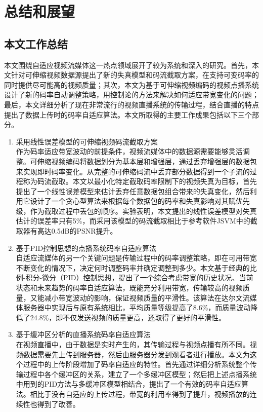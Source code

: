 \chapter{总结和展望}

\section{本文工作总结}

本文围绕自适应视频流媒体这一热点领域展开了较为系统和深入的研究。首先，本文针对可伸缩视频数据源提出了新的失真模型和码流截取方案，在支持可变码率的同时提供尽可能高的视频质量；其次，本文为基于可伸缩视频编码的视频点播系统设计了新的码率自动调整策略，用控制论的方法来解决如何适应带宽变化的问题；最后，本文详细分析了现在非常流行的视频直播系统的传输过程，结合直播的特点提出了数据上传时的码率自适应算法。本文所取得的主要工作成果包括以下三个部分。
\begin{enumerate}
\item {采用线性误差模型的可伸缩视频码流截取方案} \\
作为码率适应带宽波动的前提条件，视频流媒体中的数据源需要能够灵活调整。可伸缩视频编码将数据划分为基本层和增强层，通过丢弃增强层的数据包来实现即时码率变化。从完整的可伸缩码流中丢弃部分数据得到一个子流的过程称为码流截取。本文以最小化特定截取码率限制下的视频失真为目标，首先提出了一个线性误差模型来估计丢弃任意数据包组合带来的失真变化，然后利用它设计了一个贪心型算法来根据每个数据包的码率和失真影响对其赋优先级，作为截取过程中丢包的顺序。实验表明，本文提出的线性误差模型对失真估计的误差率只有5\%，而采用该模型的码流截取相比于参考软件JSVM中的截取器有高达0.5dB的PSNR提升。
\item {基于PID控制思想的点播系统码率自适应算法} \\
自适应流媒体的另一个关键问题是传输过程中的码率调整策略，即在可用带宽不断变化的情况下，决定何时调整码率并确定调整到多少。本文基于经典的比例-积分-微分（PID）控制思想，提出了一个综合考虑带宽的历史状况、当前状态和未来趋势的码率自适应算法，既能充分利用带宽，传输较高的视频质量，又能减小带宽波动的影响，保证视频质量的平滑性。该算法在达尔文流媒体服务器中实现后与原有系统相比，平均质量等级提高了8.6\%，而质量波动降低了24.8\%，即不仅发送视频的质量更高，还取得了更好的平滑性。
\item {基于缓冲区分析的直播系统码率自适应算法} \\
在视频直播中，由于数据是实时产生的，其传输过程与视频点播有所不同。视频数据需要先上传到服务器，然后由服务器分发到观看者进行播放。本文为这个过程中的上传阶段增加了码率自适应的特性。首先通过详细分析系统整个传输过程中各个缓冲区的关系，建立了一个多缓冲区模型；然后把上述点播系统中用到的PID方法与多缓冲区模型相结合，提出了一个有效的码率自适应算法。相比于没有自适应的上传过程，带宽的利用率得到了提升，视频播放的连续性也得到了改善。
\end{enumerate}

